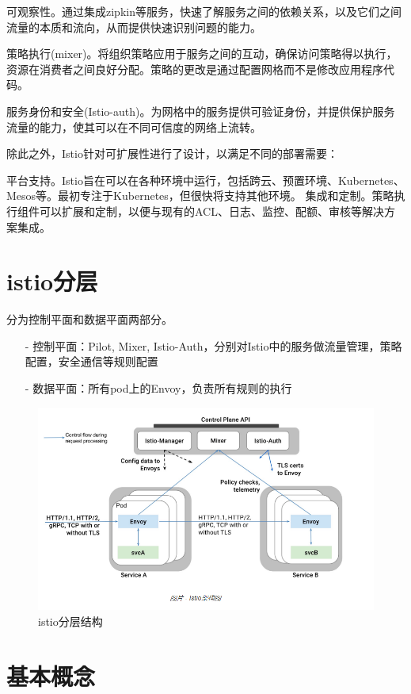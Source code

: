 \documentclass{ctexart}
\begin{document}
可观察性。通过集成zipkin等服务，快速了解服务之间的依赖关系，以及它们之间流量的本质和流向，从而提供快速识别问题的能力。

策略执行(mixer)。将组织策略应用于服务之间的互动，确保访问策略得以执行，资源在消费者之间良好分配。策略的更改是通过配置网格而不是修改应用程序代码。

服务身份和安全(Istio-auth)。为网格中的服务提供可验证身份，并提供保护服务流量的能力，使其可以在不同可信度的网络上流转。

除此之外，Istio针对可扩展性进行了设计，以满足不同的部署需要：

平台支持。Istio旨在可以在各种环境中运行，包括跨云、预置环境、Kubernetes、Mesos等。最初专注于Kubernetes，但很快将支持其他环境。
集成和定制。策略执行组件可以扩展和定制，以便与现有的ACL、日志、监控、配额、审核等解决方案集成。

\section{istio分层}
分为控制平面和数据平面两部分。 
\begin{enumerate}
	\item [-] 控制平面：Pilot, Mixer, Istio-Auth，分别对Istio中的服务做流量管理，策略配置，安全通信等规则配置 
	\item [-] 数据平面：所有pod上的Envoy，负责所有规则的执行
\end{enumerate}
\begin{figure}[H]
\includegraphics[scale=0.5]{istio/framework2.png}
\caption{istio分层结构}
\end{figure}

\section{基本概念}
\end{document}
